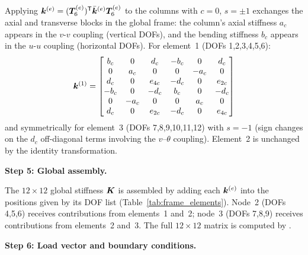 \begin{example}
Applying $\bm{k}^{(e)} = (\bm{T}_6^{(e)})^{\mathsf{T}}\bar{\bm{k}}^{(e)}\bm{T}_6^{(e)}$
to the columns with $c=0$, $s=\pm1$ exchanges the axial and transverse
blocks in the global frame: the column's axial stiffness $a_c$ appears in
the $v$-$v$ coupling (vertical DOFs), and the bending stiffness $b_c$
appears in the $u$-$u$ coupling (horizontal DOFs). For element~1
(DOFs 1,2,3,4,5,6):
\begin{equation*}
    \bm{k}^{(1)} =
    \begin{bmatrix}
         b_c  &  0   &  d_c  & -b_c &  0   &  d_c  \\
         0    &  a_c &  0    &  0   & -a_c &  0    \\
         d_c  &  0   & e_{4c}& -d_c &  0   & e_{2c}\\
        -b_c  &  0   & -d_c  &  b_c &  0   & -d_c  \\
         0    & -a_c &  0    &  0   &  a_c &  0    \\
         d_c  &  0   & e_{2c}& -d_c &  0   & e_{4c}
    \end{bmatrix}
\end{equation*}
and symmetrically for element~3 (DOFs 7,8,9,10,11,12) with $s=-1$
(sign changes on the $d_c$ off-diagonal terms involving the $v$--$\theta$
coupling). Element~2 is unchanged by the identity transformation.

\medskip
\noindent\textbf{Step 5: Global assembly.}

The $12\times12$ global stiffness $\bm{K}$ is assembled by adding each
$\bm{k}^{(e)}$ into the positions given by its DOF list
(Table~\ref{tab:frame_elements}). Node~2 (DOFs 4,5,6) receives
contributions from elements~1 and~2; node~3 (DOFs 7,8,9) receives
contributions from elements~2 and~3. The full $12\times12$ matrix is
computed by .

\medskip
\noindent\textbf{Step 6: Load vector and boundary conditions.}


\end{example}
